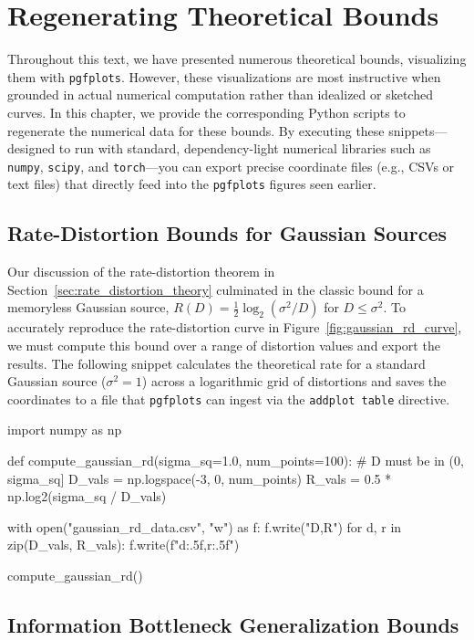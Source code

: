 \chapter{Regenerating Theoretical Bounds}
\label{ch:regenerating_bounds}

Throughout this text, we have presented numerous theoretical bounds, visualizing them with \texttt{pgfplots}. However, these visualizations are most instructive when grounded in actual numerical computation rather than idealized or sketched curves. In this chapter, we provide the corresponding Python scripts to regenerate the numerical data for these bounds. By executing these snippets---designed to run with standard, dependency-light numerical libraries such as \texttt{numpy}, \texttt{scipy}, and \texttt{torch}---you can export precise coordinate files (e.g., CSVs or text files) that directly feed into the \texttt{pgfplots} figures seen earlier.

\section{Rate-Distortion Bounds for Gaussian Sources}

Our discussion of the rate-distortion theorem in Section~\ref{sec:rate_distortion_theory} culminated in the classic bound for a memoryless Gaussian source, $R(D) = \frac{1}{2} \log_2(\sigma^2 / D)$ for $D \leq \sigma^2$. To accurately reproduce the rate-distortion curve in Figure~\ref{fig:gaussian_rd_curve}, we must compute this bound over a range of distortion values and export the results. The following snippet calculates the theoretical rate for a standard Gaussian source ($\sigma^2 = 1$) across a logarithmic grid of distortions and saves the coordinates to a file that \texttt{pgfplots} can ingest via the \texttt{addplot table} directive.

\begin{pycode}
import numpy as np

def compute_gaussian_rd(sigma_sq=1.0, num_points=100):
    # D must be in (0, sigma_sq]
    D_vals = np.logspace(-3, 0, num_points)
    R_vals = 0.5 * np.log2(sigma_sq / D_vals)
    
    with open("gaussian_rd_data.csv", "w") as f:
        f.write("D,R\n")
        for d, r in zip(D_vals, R_vals):
            f.write(f"{d:.5f},{r:.5f}\n")

compute_gaussian_rd()
\end{pycode}

\section{Information Bottleneck Generalization Bounds}


